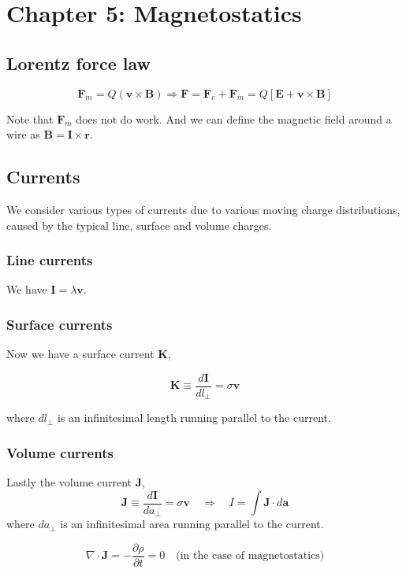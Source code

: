 \documentclass[a4paper]{article}
\begin{document}
\section{Chapter 5: Magnetostatics}

\subsection{Lorentz force law}
\begin{equation}
    \bm{F}_{m}=Q(\bm{v}\times\bm{B})\Rightarrow \bm{F}=\bm{F}_{e}+\bm{F}_m=Q[\bm{E}+\bm{v}\times\bm{B}]
\end{equation}

Note that $\bm{F}_m$ does not do work. And we can define the magnetic field around a wire as $\bm{B}=\bm{I}\times\bm{r}$.

\subsection{Currents}
We consider various types of currents due to various moving charge distributions, caused by the typical line, surface and volume charges.
\subsubsection*{Line currents}
We have $\bm{I}=\lambda\bm{v}$.
\subsubsection*{Surface currents}
Now we have a surface current $\bm{K}$,

\begin{equation}
    \bm{K}\equiv \frac{d\bm{I}}{dl_{\perp}}=\sigma\bm{v}
\end{equation}

where $dl_{\perp}$ is an infinitesimal length running parallel to the current.
\subsubsection*{Volume currents}
Lastly the volume current $\bm{J}$,
\begin{equation}
    \bm{J}\equiv \frac{d\bm{I}}{da_{\perp}}=\sigma\bm{v}\quad\Rightarrow\quad I=\int \bm{J}\cdot d\bm{a} 
\end{equation}
where $da_{\perp}$ is an infinitesimal area running parallel to the current.

\begin{equation}
    \nabla\cdot \bm{J}=-\frac{\partial\rho}{\partial t}=0\quad \text{(in the case of magnetostatics)}
\end{equation}
\end{document}
